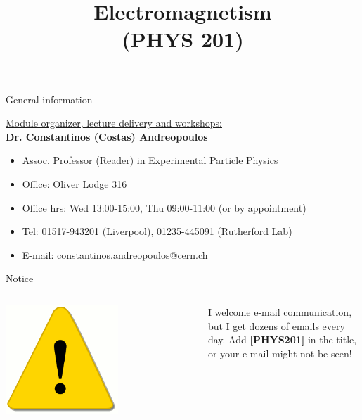 \renewcommand{\prevlecture}{0}
\renewcommand{\thislecture}{0}
\renewcommand{\nextlecture}{1}

%
%

\title[PHYS 201]
{
  \Huge{Electromagnetism}\\(PHYS 201)\\
}



\begin{frame}[plain]
  \titlepage
\end{frame}


%
%

\begin{frame}{General information}

\underline{Module organizer, lecture delivery and workshops:}\\
\vspace{0.2cm}
{\bf Dr. Constantinos (Costas) Andreopoulos}
\vspace{0.2cm}
\begin{itemize}
\item Assoc. Professor (Reader) in Experimental Particle Physics
\item Office: Oliver Lodge 316
\item Office hrs: Wed 13:00-15:00, Thu 09:00-11:00 (or by appointment)
\item Tel: 01517-943201 (Liverpool), 01235-445091 (Rutherford Lab)
\item E-mail: constantinos.andreopoulos@cern.ch
\end{itemize}

\begin{block001}{Notice}
\begin{columns}
  \begin{column}{0.15\textwidth}
   \begin{center}
     \includegraphics[width=0.60\textwidth]{./images/icons/warning.png}\\
   \end{center}
  \end{column}
  \begin{column}{0.85\textwidth}
  {\small
     I welcome e-mail communication, but I get dozens of emails every day.
     Add {\bf [PHYS201]} in the title, or your e-mail might not be seen!
   }
  \end{column}
\end{columns}
\end{block001}


\end{frame}
